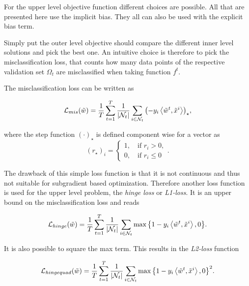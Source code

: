 For the upper level objective function different choices are possible. All that are presented here use the implicit bias. They all can also be used with the explicit bias term.

Simply put the outer level objective should compare the different inner level solutions and pick the best one. An intuitive choice is therefore to pick the misclassification loss, that counts how many data points of the respective validation set \(\Omega_t\) are misclassified when taking function \(f^t\).

The misclassification loss can be written as

\begin{equation}
	\mathcal{L}_{mis}(\tilde{w}) = \frac{1}{T}\sum_{t=1}^T\frac{1}{|\mathcal{N}_t|}\sum_{i \in \mathcal{N}_t}{\left(-y_i\left\langle \tilde{w}^t,\tilde{x}^i\right\rangle\right)_{\star}},
\label{misclass_loss}
\end{equation}

where the step function \((\cdot)_{\star}\) is defined component wise for a vector as
\begin{equation}
	(r_{\star})_i = \left\{\begin{array}{c} 1, \quad \text{if } r_i > 0, \\ 0, \quad \text{if } r_i \leq 0 \end{array} \right. .
\label{step_fun}
\end{equation}

The drawback of this simple loss function is that it is not continuous and thus not suitable for subgradient based optimization. Therefore another loss function is used for the upper level problem, the \emph{hinge loss} or \emph{L1-loss}. It is an upper bound on the misclassification loss and reads

\begin{equation}
		\mathcal{L}_{hinge}(\tilde{w}) = \frac{1}{T}\sum_{t=1}^T\frac{1}{|\mathcal{N}_t|}\sum_{i \in \mathcal{N}_t}{\max\left\{1-y_i\left\langle \tilde{w}^t,\tilde{x}^i\right\rangle,0\right\}}.
\label{hinge_loss}
\end{equation}

It is also possible to square the max term. This results in the \emph{L2-loss} function

\begin{equation}
		\mathcal{L}_{hingequad}(\tilde{w}) = \frac{1}{T}\sum_{t=1}^T\frac{1}{|\mathcal{N}_t|}\sum_{i \in \mathcal{N}_t}{\max\left\{1-y_i\left\langle \tilde{w}^t,\tilde{x}^i\right\rangle,0\right\}^2}.
\label{hingequad_loss}
\end{equation}

